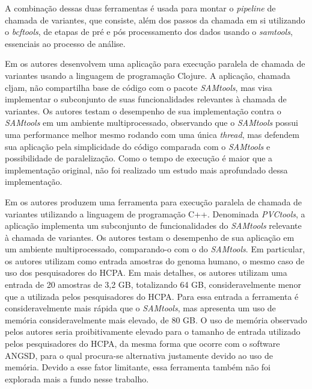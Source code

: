 \documentclass[cic,tc]{iiufrgs}
\begin{document}
A combinação dessas duas ferramentas é usada para montar o \textit{pipeline} de chamada
de variantes, que consiste, além dos passos da chamada em si utilizando o
\textit{bcftools}, de etapas de pré e pós processamento dos dados usando o \textit{samtools},
essenciais ao processo de análise.

Em \cite{takeuchi2016cljam} os autores desenvolvem uma aplicação para execução
paralela de chamada de variantes usando a linguagem de programação Clojure. A
aplicação, chamada cljam, não compartilha base de código com o pacote \textit{SAMtools},
mas visa implementar o subconjunto de suas funcionalidades relevantes à
chamada de variantes. Os autores testam o desempenho de sua implementação
contra o \textit{SAMtools} em um ambiente multiprocessado, observando que o \textit{SAMtools}
possui uma performance melhor mesmo rodando com uma única \textit{thread}, mas defendem
sua aplicação pela simplicidade do código comparada com o \textit{SAMtools} e
possibilidade de paralelização. Como o tempo de execução é maior que a
implementação original, não foi realizado um estudo mais aprofundado dessa
implementação.

Em \cite{jin2019pvctools} os autores produzem uma ferramenta para execução
paralela de chamada de variantes utilizando a linguagem de programação C++.
Denominada \textit{PVCtools}, a aplicação implementa um subconjunto de funcionalidades
do \textit{SAMtools} relevante à chamada de variantes. Os autores testam o desempenho de
sua aplicação em um ambiente multiprocessado, comparando-o com o do \textit{SAMtools}.
Em particular, os autores utilizam como entrada amostras do genoma humano,
o mesmo caso de uso dos pesquisadores do HCPA. Em mais detalhes, os
autores utilizam uma entrada de 20 amostras de 3,2 GB, totalizando 64 GB,
consideravelmente menor que a utilizada pelos pesquisadores do HCPA. Para essa
entrada a ferramenta é consideravelmente mais rápida que o \textit{SAMtools}, mas
apresenta um uso de memória consideravelmente mais elevado, de 80 GB. O uso de
memória observado pelos autores seria proibitivamente elevado para o tamanho de
entrada utilizado pelos pesquisadores do HCPA, da mesma forma que ocorre com o
software ANGSD, para o qual procura-se alternativa justamente devido ao uso
de memória. Devido a esse fator limitante, essa ferramenta também não foi
explorada mais a fundo nesse trabalho.
\end{document}
